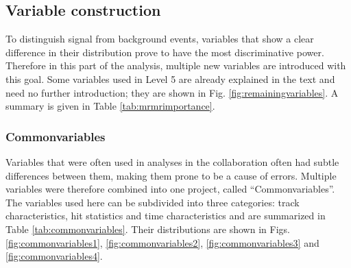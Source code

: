 \subsection{Variable construction}
To distinguish signal from background events, variables that show a clear difference in their distribution prove to have the most discriminative power. Therefore in this part of the analysis, multiple new variables are introduced with this goal. Some variables used in Level 5 are already explained in the text and need no further introduction; they are shown in Fig. \ref{fig:remainingvariables}. A summary is given in Table \ref{tab:mrmrimportance}.

\subsubsection{Commonvariables}
\label{subsub:commonvariables}
Variables that were often used in analyses in the collaboration often had subtle differences between them, making them prone to be a cause of errors. Multiple variables were therefore combined into one project, called ``Commonvariables''. The variables used here can be subdivided into three categories: track characteristics, hit statistics and time characteristics and are summarized in Table \ref{tab:commonvariables}. Their distributions are shown in Figs. \ref{fig:commonvariables1}, \ref{fig:commonvariables2}, \ref{fig:commonvariables3} and \ref{fig:commonvariables4}.

